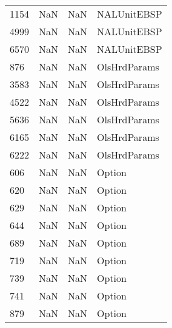 \begin{tabular}{llll}
1154 &                   NaN &                        NaN &                               NALUnitEBSP \\
4999 &                   NaN &                        NaN &                               NALUnitEBSP \\
6570 &                   NaN &                        NaN &                               NALUnitEBSP \\
876  &                   NaN &                        NaN &                              OlsHrdParams \\
3583 &                   NaN &                        NaN &                              OlsHrdParams \\
4522 &                   NaN &                        NaN &                              OlsHrdParams \\
5636 &                   NaN &                        NaN &                              OlsHrdParams \\
6165 &                   NaN &                        NaN &                              OlsHrdParams \\
6222 &                   NaN &                        NaN &                              OlsHrdParams \\
606  &                   NaN &                        NaN &                                    Option \\
620  &                   NaN &                        NaN &                                    Option \\
629  &                   NaN &                        NaN &                                    Option \\
644  &                   NaN &                        NaN &                                    Option \\
689  &                   NaN &                        NaN &                                    Option \\
719  &                   NaN &                        NaN &                                    Option \\
739  &                   NaN &                        NaN &                                    Option \\
741  &                   NaN &                        NaN &                                    Option \\
879  &                   NaN &                        NaN &                                    Option \\

\end{tabular}
